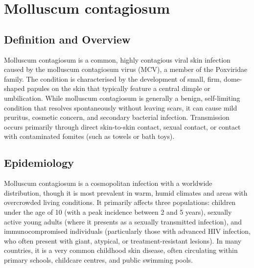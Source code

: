 \chapter{Molluscum contagiosum}

\section*{Definition and Overview}
Molluscum contagiosum is a common, highly contagious viral skin infection caused by the molluscum contagiosum virus (MCV), a member of the Poxviridae family. The condition is characterised by the development of small, firm, dome-shaped papules on the skin that typically feature a central dimple or umbilication. While molluscum contagiosum is generally a benign, self-limiting condition that resolves spontaneously without leaving scars, it can cause mild pruritus, cosmetic concern, and secondary bacterial infection. Transmission occurs primarily through direct skin-to-skin contact, sexual contact, or contact with contaminated fomites (such as towels or bath toys).

\section*{Epidemiology}
Molluscum contagiosum is a cosmopolitan infection with a worldwide distribution, though it is most prevalent in warm, humid climates and areas with overcrowded living conditions. It primarily affects three populations: children under the age of 10 (with a peak incidence between 2 and 5 years), sexually active young adults (where it presents as a sexually transmitted infection), and immunocompromised individuals (particularly those with advanced HIV infection, who often present with giant, atypical, or treatment-resistant lesions). In many countries, it is a very common childhood skin disease, often circulating within primary schools, childcare centres, and public swimming pools.

